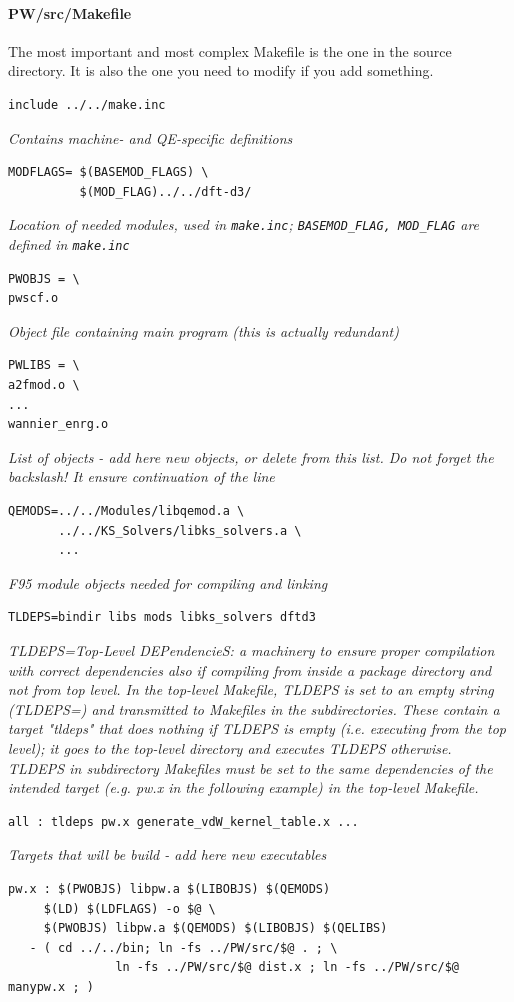 \documentclass[12pt,a4paper]{article}
\def\qe{QE}
\begin{document}
\paragraph{PW/src/Makefile}
The most important and most complex Makefile is the one in the
source directory. It is also the one you need to modify if you
add something.
\begin{verbatim}
include ../../make.inc
\end{verbatim}
{\em Contains machine- and \qe-specific definitions}
\begin{verbatim}
MODFLAGS= $(BASEMOD_FLAGS) \
          $(MOD_FLAG)../../dft-d3/
\end{verbatim}
    {\em Location of needed modules, used in  \texttt{make.inc};
      \texttt{BASEMOD\_FLAG, MOD\_FLAG} are defined in \texttt{make.inc}}
\begin{verbatim}
PWOBJS = \
pwscf.o
\end{verbatim}
{\em Object file containing main program (this is actually redundant)}
\begin{verbatim}
PWLIBS = \
a2fmod.o \
...
wannier_enrg.o
\end{verbatim}
{\em List of objects - add here new objects, or delete from this list. Do not
forget the backslash! It ensure continuation of the line}
\begin{verbatim}
QEMODS=../../Modules/libqemod.a \
       ../../KS_Solvers/libks_solvers.a \
       ...
\end{verbatim}
{\em F95 module objects needed for compiling and linking}
\begin{verbatim}
TLDEPS=bindir libs mods libks_solvers dftd3
\end{verbatim}
{\em TLDEPS=Top-Level DEPendencieS: a machinery to ensure proper
compilation with correct dependencies also if compiling from inside
a package directory and not from top level. In the top-level Makefile,
TLDEPS is set to an empty string (TLDEPS=) and transmitted to Makefiles
in the subdirectories. These contain a target "tldeps" that does nothing
if TLDEPS is empty (i.e. executing from the top level); it goes to the
top-level directory and executes TLDEPS otherwise. TLDEPS in subdirectory
Makefiles must be set to the same dependencies of the intended target
(e.g. pw.x in the following example) in the top-level Makefile.
}
\begin{verbatim}
all : tldeps pw.x generate_vdW_kernel_table.x ...
\end{verbatim}
{\em Targets that will be build - add here new executables}
\begin{verbatim}
pw.x : $(PWOBJS) libpw.a $(LIBOBJS) $(QEMODS)
     $(LD) $(LDFLAGS) -o $@ \
     $(PWOBJS) libpw.a $(QEMODS) $(LIBOBJS) $(QELIBS)
   - ( cd ../../bin; ln -fs ../PW/src/$@ . ; \
               ln -fs ../PW/src/$@ dist.x ; ln -fs ../PW/src/$@ manypw.x ; )
\end{verbatim}
\end{document}
